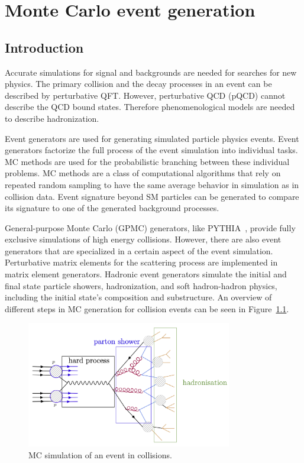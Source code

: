 %
%

\chapter{Monte Carlo event generation}
\label{event_sim}

\section{Introduction}

Accurate simulations for signal and backgrounds are needed for searches for new physics. The primary collision and the decay processes in an event can be described by perturbative QFT. However, perturbative QCD (pQCD) cannot describe the QCD bound states. Therefore phenomenological models are needed to describe hadronization.

Event generators are used for generating simulated particle physics events. Event generators factorize the full process of the event simulation into individual tasks. MC methods are used for the probabilistic branching between these individual problems. MC methods are a class of computational algorithms that rely on repeated random sampling to have the same average behavior in simulation as in collision data. Event signature beyond SM particles can be generated to compare its signature to one of the generated background processes.

General-purpose Monte Carlo (GPMC) generators, like PYTHIA~\cite{Sjostrand:2014zea}, provide fully exclusive simulations of high energy collisions. However, there are also event generators that are specialized in a certain aspect of the event simulation. Perturbative matrix elements for the scattering process are implemented in matrix element generators. Hadronic event generators simulate the initial and final state particle showers, hadronization, and soft hadron-hadron physics, including the initial state's composition and substructure. An overview of different steps in MC generation for \pp collision events can be seen in Figure~\ref{fig:simulation}.

\begin{figure}[htbp]
  \centering
  \includegraphics[width=0.8\textwidth]{plots/chapter4/simulation.png}
  \caption{MC simulation of an event in \pp collisions.}
  \label{fig:simulation}
\end{figure}


